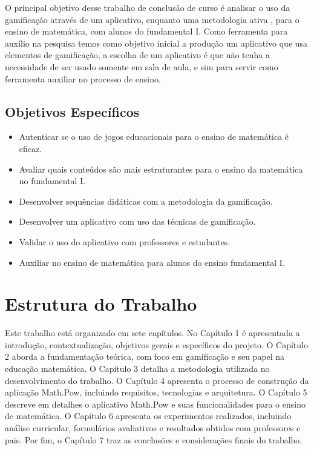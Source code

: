  O principal objetivo desse trabalho de conclusão de curso é analisar o uso da gamificação através de um aplicativo,  enquanto uma metodologia ativa , para o ensino de matemática, com  alunos do fundamental I. Como ferramenta para auxílio na pesquisa temos como objetivo inicial a produção um aplicativo que usa elementos de gamificação, a escolha de um aplicativo é que não tenha a necessidade de ser usado somente em sala de aula, e sim para servir como ferramenta auxiliar no processo de ensino.


\subsection{Objetivos Específicos}

\begin{itemize}
\item{Autenticar se o uso de jogos educacionais para o ensino de matemática é eficaz.
}
\item {Avaliar quais conteúdos são mais estruturantes para o ensino da matemática no fundamental I.
} 
\item {Desenvolver sequências didáticas com a metodologia da gamificação.
 }  
\item {Desenvolver um aplicativo com uso das técnicas de gamificação.
}
\item {Validar o uso do aplicativo com professores e estudantes.
}
\item {Auxiliar no ensino de matemática para alunos do ensino fundamental I.
}
\end{itemize}

\section{Estrutura do Trabalho}

Este trabalho está organizado em sete capítulos. No Capítulo 1 é apresentada a introdução, contextualização, objetivos gerais e específicos do projeto. O Capítulo 2 aborda a fundamentação teórica, com foco em gamificação e seu papel na educação matemática. O Capítulo 3 detalha a metodologia utilizada no desenvolvimento do trabalho. O Capítulo 4 apresenta o processo de construção da aplicação Math.Pow, incluindo requisitos, tecnologias e arquitetura. O Capítulo 5 descreve em detalhes o aplicativo Math.Pow e suas funcionalidades para o ensino de matemática. O Capítulo 6 apresenta os experimentos realizados, incluindo análise curricular, formulários avaliativos e resultados obtidos com professores e pais. Por fim, o Capítulo 7 traz as conclusões e considerações finais do trabalho.


